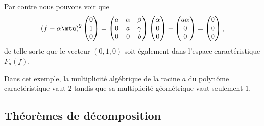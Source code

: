 \begin{remark}
    Par contre nous pouvons voir que
    \begin{equation}
        (f-\alpha\mtu)^2\begin{pmatrix}
             0   \\
            1    \\
            0
        \end{pmatrix}=
        \begin{pmatrix}
            a    &   \alpha    &   \beta    \\
            0    &   a    &   \gamma    \\
            0    &   0    &   b
        \end{pmatrix}
        \begin{pmatrix}
            \alpha    \\
            0    \\
            0
        \end{pmatrix}-\begin{pmatrix}
            a\alpha    \\
            0    \\
            0
        \end{pmatrix}=\begin{pmatrix}
            0    \\
            0    \\
            0
        \end{pmatrix},
    \end{equation}
    de telle sorte que le vecteur \( (0,1,0)\) soit également dans l'espace caractéristique \( F_a(f)\).

    Dans cet exemple, la multiplicité algébrique de la racine \( a\) du polynôme caractéristique vaut \( 2\) tandis que sa multiplicité géométrique vaut seulement \( 1\).
\end{remark}

\subsection{Théorèmes de décomposition}

